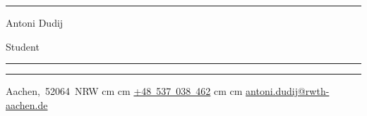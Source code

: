\documentclass[10pt, letterpaper]{article}
\newenvironment{header}{
    \setlength{\topsep}{0pt}\par\kern\topsep\centering\linespread{0.3}
}{
    \par\kern\topsep
} %
\let\hrefWithoutArrow\href
\renewcommand{\href}[2]{\hrefWithoutArrow{#1}{\ifthenelse{\equal{#2}{}}{ }{#2 }\raisebox{.15ex}{\footnotesize \faExternalLink*}}}
\begin{document}
    \newcommand{\AND}{\unskip
        \cleaders\copy\ANDbox\hskip\wd\ANDbox
        \ignorespaces
    }
    \newsavebox\ANDbox
    \sbox\ANDbox{}

    \begin{header}
        \hrule
        \vspace{0.5cm}
        {\fontsize{30 pt}{30 pt}\selectfont Antoni Dudij}

        \vspace{0.2cm}
        {\fontsize{18 pt}{18pt}\selectfont Student}

        \vspace{0.4cm} %
        \normalsize
        {\color{black}\rule{\textwidth}{0.1pt}}
        \vspace{0.035cm} %
        {\color{black}\rule{\textwidth}{0.1pt}}

        \vspace{0.4cm}

        \mbox{{\color{black}\footnotesize\faMapMarker*}\hspace*{0.13cm}Aachen, 52064 NRW}  cm \textbullet {} cm
        \mbox{\hrefWithoutArrow{tel:+48-537-038-462}{\color{black}{\footnotesize\faPhone*}\hspace*{0.13cm}+48 537 038 462}}  cm \textbullet {} cm
        \mbox{\hrefWithoutArrow{mailto:antoni.dudij@rwth-aachen.de}{\color{black}{\footnotesize\faEnvelope[regular]}\hspace*{0.13cm}antoni.dudij@rwth-aachen.de}}
    \end{header}

    \vspace{0.25 cm}


    
    
    
    
    
    
    
    
    
\end{document}
